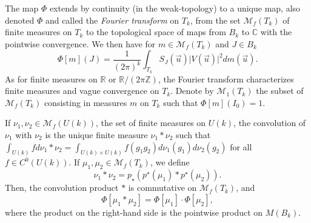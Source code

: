 \documentclass[10pt,11pt]{amsart}%
\begin{document}
The map $\Phi$ extends by continuity (in the weak-topology) to a unique map, also denoted $\Phi$ and called the {\it Fourier transform} on $T_k$, from the set $\mathcal{M}_{f}( T_{k})$ of finite measures on $ T_{k}$ to the topological space of maps from $B_{k}$ to $\mathbb{C}$ with the pointwise convergence. We then have for $m\in \mathcal{M}_{f}( T_{k})$ and $J\in B_{k}$
\begin{equation}\label{eq:fourier_transform_measure_Uk}
\Phi[m](J)=\frac{1}{(2\pi)^k}\int_{ T_{k}}S_{J}(\vec{u})\vert V(\vec{u})\vert^2dm(\vec{u}).
\end{equation}
As for finite measures on $\mathbb{R}$ or $\mathbb{R}/(2\pi\mathbb{Z})$, the Fourier transform characterizes finite measures and vague convergence on $T_k$. Denote by $\mathcal{M}_{1}( T_{k})$ the subset of $\mathcal{M}_{f}( T_{k})$ consisting in measures $m$ on $T_k$ such that $\Phi[m](I_0)=1$. 

If $\nu_1,\nu_2\in \mathcal{M}_{f}(U(k))$, the set of finite measures on $U(k)$, the convolution of $\nu_1$ with $\nu_2$ is the unique finite measure $\nu_1\ast\nu_2$ such that $\int_{U(k)}fd\nu_1\ast\nu_2=\int_{U(k)\times U(k)}f(g_1g_2)d\nu_1(g_1)d\nu_2(g_2)$ for all $f\in C^0(U(k))$. If $\mu_1,\mu_2\in \mathcal{M}_f( T_{k})$, we define
$$\nu_1\ast\nu_2=p_{\star}(p^{\star}(\mu_1)\ast p^{\star}(\mu_2)).$$
Then, the convolution product $\ast$ is commutative on $\mathcal{M}_f( T_{k})$, and 
$$\Phi[\mu_1\ast\mu_2]=\Phi[\mu_1]\cdot \Phi[\mu_2],$$
where the product on the right-hand side is the pointwise product on $M(B_{k})$.
\end{document}
